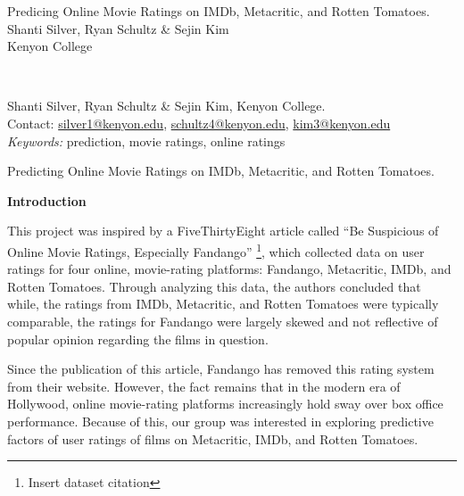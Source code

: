 \documentclass[letter,12pt]{article}
\begin{document}
	\thispagestyle{plain}
	\begin{center}
		\vspace*{150pt}
		Predicing Online Movie Ratings on IMDb, Metacritic, and Rotten Tomatoes. \\
		Shanti Silver, Ryan Schultz \& Sejin Kim \\
		Kenyon College \\
	\end{center}
	\vspace*{120pt}
	 \\
	\begin{raggedright}
		Shanti Silver, Ryan Schultz \& Sejin Kim, Kenyon College. \\
		Contact: \href{mailto:silver1@kenyon.edu}{silver1@kenyon.edu}, \href{mailto:schultz4@kenyon.edu}{schultz4@kenyon.edu}, \href{mailto:kim3@kenyon.edu}{kim3@kenyon.edu} \\
		\vspace*{40pt}
		\textit{Keywords:} prediction, movie ratings, online ratings
	\end{raggedright}
	
	\newpage

	\begin{center}
		Predicting Online Movie Ratings on IMDb, Metacritic, and Rotten Tomatoes.
	\end{center}
	\begin{center}
		\textbf{Introduction}
	\end{center}
	\justify
	This project was inspired by a FiveThirtyEight article called “Be Suspicious of Online Movie Ratings, Especially Fandango” \footnote{Insert dataset citation}, which collected data on user ratings for four online, movie-rating platforms: Fandango, Metacritic, IMDb, and Rotten Tomatoes. Through analyzing this data, the authors concluded that while, the ratings from IMDb, Metacritic, and Rotten Tomatoes were typically comparable, the ratings for Fandango were largely skewed and not reflective of popular opinion regarding the films in question. 

	Since the publication of this article, Fandango has removed this rating system from their website. However, the fact remains that in the modern era of Hollywood, online movie-rating platforms increasingly hold sway over box office performance. Because of this, our group was interested in exploring predictive factors of user ratings of films on Metacritic, IMDb, and Rotten Tomatoes. 
\end{document}
